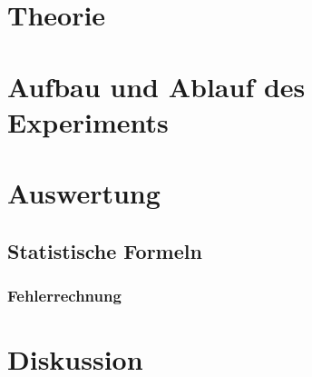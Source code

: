 \documentclass[a4,11pt]{article}
\newcommand{\V}{V605}
\begin{document}



\tableofcontents
\clearpage


\section{Theorie}

\clearpage


\section{Aufbau und Ablauf des Experiments}

\clearpage


\section{Auswertung}
\subsection{Statistische Formeln}
\subsubsection{Fehlerrechnung}
\label{sec:Fehlerrechnung}

%

\clearpage


\section{Diskussion}


\clearpage
\listoftodos
\listoffigures
\listoftables
\clearpage
\nocite{\V}
\printbibliography[title = Literaturverzeichnis]
\end{document}
